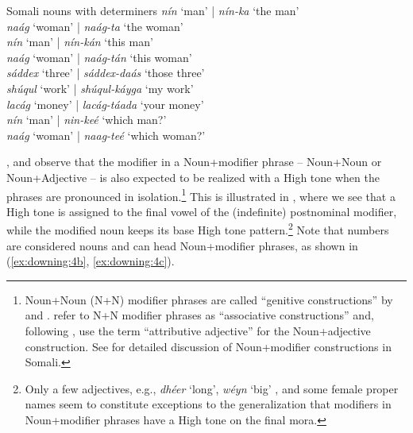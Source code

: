 \documentclass[output=paper]{langscibook}
\begin{document}
\ea  Somali nouns with determiners \citep[160--168]{Saeed1993} \label{ex:downing:3}
  \ea  \textit{nín}   ‘man’  |  \textit{nín-ka}   ‘the man’\label{ex:downing:3a}\\
  \ex  \textit{naág}  ‘woman’ |  \textit{naág-ta}  ‘the woman’ \label{ex:downing:3b}\\
  \ex  \textit{nín}  ‘man’  | \textit{nín-kán}  ‘this man’\label{ex:downing:3c}\\
  \ex  \textit{naág}  ‘woman’ |  \textit{naág-tán}  ‘this woman’\label{ex:downing:3d}\\
  \ex  \textit{sáddex}  ‘three’ | \textit{sáddex-daás}   ‘those three’\label{ex:downing:3e}\\
  \ex  \textit{shúqul}  ‘work’ | \textit{shúqul-káyga}  ‘my work’\label{ex:downing:3f}\\
  \ex  \textit{lacág} ‘money’ | \textit{lacág-táada} ‘your money’\label{ex:downing:3g}\\
  \ex  \textit{nín}  ‘man’  | \textit{nin-keé}  ‘which man?’\label{ex:downing:3h}\\
  \ex  \textit{naág} ‘woman’ | \textit{naag-teé} ‘which woman?’\label{ex:downing:3i}\\
  \z
\z
 
\citet{Green2016,Hyman1981}, and \citet{Saeed1993} observe that the modifier in a Noun+modifier phrase – Noun+Noun or Noun+Adjective – is also expected to be realized with a High tone when the phrases are pronounced in isolation.\footnote{Noun+Noun (N+N) modifier phrases are called ``genitive constructions'' by \citet{Hyman1981} and \citet{Saeed1993}. \citet{Green2016} refer to N+N modifier phrases as ``associative constructions'' and, following \citet{Saeed1993}, use the term ``attributive adjective'' for the Noun+adjective construction. See \citet{Saeed1993} for detailed discussion of Noun+modifier constructions in Somali.} This is illustrated in , where we see that a High tone is assigned to the final vowel of the (indefinite) postnominal modifier, while the modified noun keeps its base High tone pattern.\footnote{Only a few adjectives, e.g., \textit{dhéer} ‘long’, \textit{wéyn} ‘big’ \citep[105--106]{Saeed1999}, and some female proper names seem to constitute exceptions to the generalization that modifiers in Noun+modifier phrases have a High tone on the final mora.} Note that numbers are considered nouns \citep[123]{Saeed1993} and can head Noun+modifier phrases, as shown in (\ref{ex:downing:4b}, \ref{ex:downing:4c}).
\end{document}
